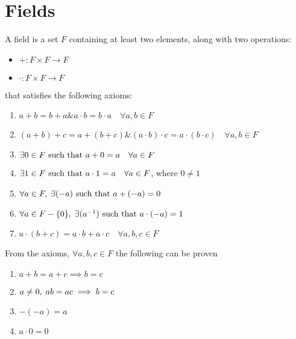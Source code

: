 \section{Fields}

A field is a set $F$ containing at least two elements, along with two operations:

\begin{itemize}
    \item $+: F \times F \to F$
    \item $\cdot: F \times F \to F$
\end{itemize}

that satisfies the following axioms:

\begin{enumerate}
    \item $a + b = b + a \& a \cdot b = b \cdot a \quad \forall a, b \in F$
    \item $(a + b) + c = a + (b + c) \& (a \cdot b) \cdot c = a \cdot (b \cdot c) \quad \forall a, b \in F$
    \item $\exists 0 \in F \text{ such that } a + 0 = a \quad \forall a \in F$
    \item $\exists 1 \in F \text{ such that } a \cdot 1 = a \quad \forall a \in F$, where $0 \not = 1$
    \item $\forall a \in F ,\; \exists (-a) \text{ such that } a + (-a) = 0$
    \item $\forall a \in F - \{0\} ,\; \exists (a^{-1}) \text{ such that } a \cdot (-a) = 1$
    \item $a \cdot (b + c) = a \cdot b + a \cdot c \quad \forall a, b, c \in F$
\end{enumerate}



From the axioms, $\forall a, b, c \in F$ the following can be proven

\begin{enumerate}
    \item $a + b = a + c \implies b = c$
    \item $a \not = 0 ,\; ab = ac \implies b = c$
    \item $-(-a) = a$
    \item $a \cdot 0 = 0$
\end{enumerate}